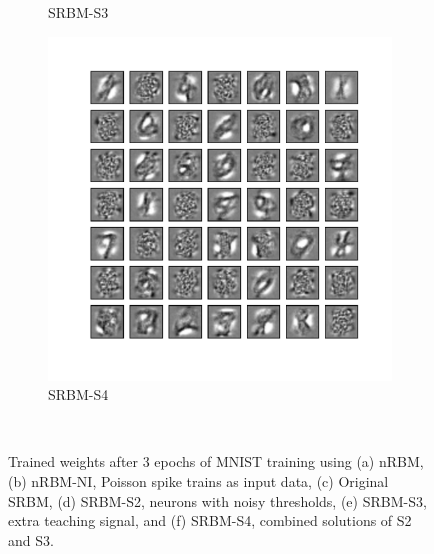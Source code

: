 \begin{figure}
\begin{subfigure}[t]{0.4\textwidth}
		\caption{SRBM-S3}
	\end{subfigure}
	\begin{subfigure}[t]{0.4\textwidth}
		\includegraphics[width=\textwidth]{pics_sdlm/53_MNIST_SRBM_all/2_60000_0.pdf}
		\caption{SRBM-S4}
	\end{subfigure}\\
	\DIFdelbeginFL %
\DIFdelendFL \DIFaddbeginFL \caption[Comparisons of trained weights using (spiking) RBMs.]{\DIFaddendFL Trained weights after 3 epochs of MNIST training using (a) nRBM, (b) nRBM-NI, Poisson spike trains as input data, (c) Original SRBM, (d) SRBM-S2, neurons with noisy thresholds, (e) SRBM-S3, extra teaching signal, and (f) SRBM-S4, combined solutions of S2 and S3.}
	\label{fig:weights_rbm}
\end{figure}

